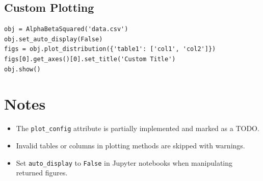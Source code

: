 \documentclass[
	ngerman,							%
	a4paper,							%
	11pt,							%
	oneside							%
	]{article}							%
\begin{document}
\subsection*{Custom Plotting}
\begin{lstlisting}
obj = AlphaBetaSquared('data.csv')
obj.set_auto_display(False)
figs = obj.plot_distribution({'table1': ['col1', 'col2']})
figs[0].get_axes()[0].set_title('Custom Title')
obj.show()
\end{lstlisting}

\section{Notes}
\begin{itemize}
    \item The \texttt{plot\_config} attribute is partially implemented and marked as a TODO.
    \item Invalid tables or columns in plotting methods are skipped with warnings.
    \item Set \texttt{auto\_display} to \texttt{False} in Jupyter notebooks when manipulating returned figures.
\end{itemize}

\clearpage


\listoffigures
\listoftables
\end{document}
